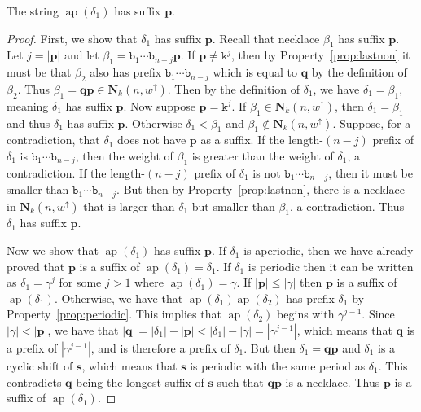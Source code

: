 \documentclass[US-letter,USenglish,authorcolumns,autoref]{lipics-v2021}
\renewcommand{\tt} {\mathtt}
\newcommand{\bN}{\mathbf{N}}
\newcommand{\bp}{\mathbf{p}}
\newcommand{\bs}{\mathbf{s}}
\newcommand{\bq}{\mathbf{q}}
\DeclareMathOperator{\ap}{ap}
\begin{document}
\begin{lemma} \label{lem:d1}
    The string $\ap(\delta_1)$ has suffix $\bp$.
\end{lemma}
%
\begin{proof}
First, we show that $\delta_1$ has suffix $\bp$. Recall that necklace $\beta_1$ has suffix $\bp$. Let $j = |\bp|$ and let $\beta_1 = \tt{b}_1\cdots \tt{b}_{n-j}\bp$. If $\bp \neq \tt{k}^j$, then by Property~\ref{prop:lastnon} it must be that $\beta_2$ also has prefix $\tt{b}_1\cdots \tt{b}_{n-j}$ which  is equal to $\bq$ by the definition of $\beta_2$. Thus $\beta_1 = \bq\bp\in\bN_k(n,w^\uparrow)$. Then by the definition of $\delta_1$, we have $\delta_1 = \beta_1$, meaning $\delta_1$ has suffix $\bp$. Now suppose $\bp = \tt{k}^j$.
 If $\beta_1\in \bN_k(n,w^\uparrow)$, then $\delta_1 = \beta_1$ and thus  $\delta_1$ has suffix $\bp$. Otherwise $\delta_1<\beta_1$ and $\beta_1\not\in \bN_k(n,w^\uparrow)$. Suppose, for a contradiction, that $\delta_1$ does not have $\bp$ as a suffix. If the length-$(n-j)$ prefix of $\delta_1$ is $\tt{b}_1\cdots \tt{b}_{n-j}$, then the weight of $\beta_1$ is greater than the weight of $\delta_1$, a contradiction. If the length-$(n-j)$ prefix of $\delta_1$ is not $\tt{b}_1\cdots \tt{b}_{n-j}$, then it must be smaller than $\tt{b}_1\cdots \tt{b}_{n-j}$. But then by Property~\ref{prop:lastnon}, there is a necklace in $\bN_k(n, w^\uparrow)$ that is larger than $\delta_1$ but smaller than $\beta_1$, a contradiction. Thus $\delta_1$ has suffix $\bp$.

Now we show that $\ap(\delta_1)$ has suffix $\bp$. If $\delta_1$ is aperiodic, then we have already proved that $\bp$ is a suffix of $\ap(\delta_1)=\delta_1$. If $\delta_1$ is periodic then it can be written as $\delta_1 = \gamma^j$ for some $j > 1$ where $\ap(\delta_1) = \gamma$.  If $|\bp| \leq |\gamma|$ then $\bp$ is a suffix of $\ap(\delta_1)$. Otherwise, we have that $\ap(\delta_1)\ap(\delta_2)$ has prefix $\delta_1$ by Property~\ref{prop:periodic}. This implies that $\ap(\delta_2)$ begins with $\gamma^{j-1}$. Since $|\gamma| < |\bp|$, we have that $|\bq| = |\delta_1|-|\bp| < |\delta_1| - |\gamma| = |\gamma^{j-1}|$, which means that $\bq$ is a prefix of $|\gamma^{j-1}|$, and is therefore a prefix of $\delta_1$. But then $\delta_1=\bq\bp$ and $\delta_1$ is a cyclic shift of $\bs$, which means that $\bs$ is periodic with the same period as $\delta_1$. This contradicts $\bq$ being the longest suffix of $\bs$ such that $\bq\bp$ is a necklace.  Thus $\bp$ is a suffix of $\ap(\delta_1)$.
\end{proof}
\end{document}
